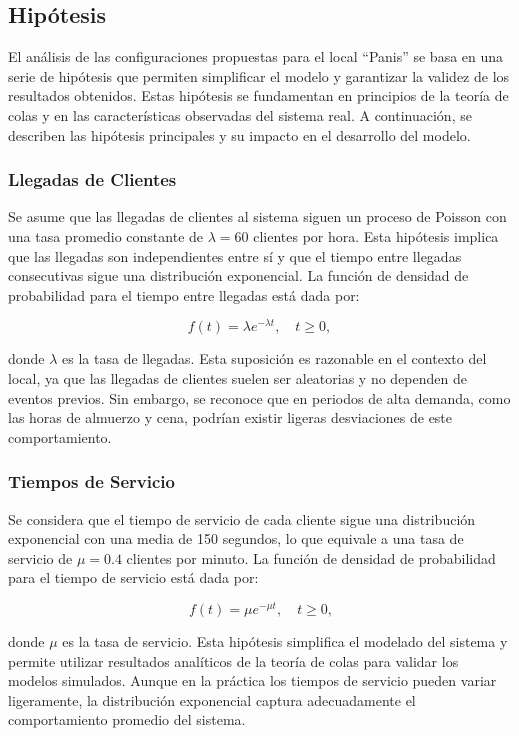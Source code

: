 \documentclass[a4paper,12pt]{article}
\begin{document}
\subsection{Hipótesis}

El análisis de las configuraciones propuestas para el local “Panis” se basa en una serie de hipótesis que permiten simplificar el modelo y garantizar la validez de los resultados obtenidos. Estas hipótesis se fundamentan en principios de la teoría de colas y en las características observadas del sistema real. A continuación, se describen las hipótesis principales y su impacto en el desarrollo del modelo.

\subsubsection{Llegadas de Clientes}

Se asume que las llegadas de clientes al sistema siguen un proceso de Poisson con una tasa promedio constante de \( \lambda = 60 \) clientes por hora. Esta hipótesis implica que las llegadas son independientes entre sí y que el tiempo entre llegadas consecutivas sigue una distribución exponencial. La función de densidad de probabilidad para el tiempo entre llegadas está dada por:

\[
f(t) = \lambda e^{-\lambda t}, \quad t \geq 0,
\]

donde \( \lambda \) es la tasa de llegadas. Esta suposición es razonable en el contexto del local, ya que las llegadas de clientes suelen ser aleatorias y no dependen de eventos previos. Sin embargo, se reconoce que en periodos de alta demanda, como las horas de almuerzo y cena, podrían existir ligeras desviaciones de este comportamiento.

\subsubsection{Tiempos de Servicio}

Se considera que el tiempo de servicio de cada cliente sigue una distribución exponencial con una media de 150 segundos, lo que equivale a una tasa de servicio de \( \mu = 0.4 \) clientes por minuto. La función de densidad de probabilidad para el tiempo de servicio está dada por:

\[\
f(t) = \mu e^{-\mu t}, \quad t \geq 0,
\]

donde \( \mu \) es la tasa de servicio. Esta hipótesis simplifica el modelado del sistema y permite utilizar resultados analíticos de la teoría de colas para validar los modelos simulados. Aunque en la práctica los tiempos de servicio pueden variar ligeramente, la distribución exponencial captura adecuadamente el comportamiento promedio del sistema.
\end{document}
